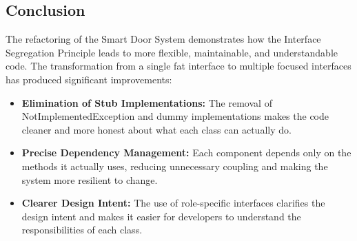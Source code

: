 \subsection{Conclusion}

The refactoring of the Smart Door System demonstrates how the Interface Segregation Principle leads to more flexible, maintainable, and understandable code. The transformation from a single fat interface to multiple focused interfaces has produced significant improvements:

\begin{itemize}
    \item \textbf{Elimination of Stub Implementations:} The removal of NotImplementedException and dummy implementations makes the code cleaner and more honest about what each class can actually do.
    
    \item \textbf{Precise Dependency Management:} Each component depends only on the methods it actually uses, reducing unnecessary coupling and making the system more resilient to change.
    
    \item \textbf{Clearer Design Intent:} The use of role-specific interfaces clarifies the design intent and makes it easier for developers to understand the responsibilities of each class.
\end{itemize}